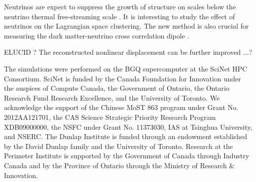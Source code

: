 \documentclass[aps,prd,twocolumn,superscriptaddress,groupedaddress,nofootinbib]{revtex4}  %
\begin{document}
Neutrinos are expect to suppress the growth of structure on scales below the 
neutrino thermal free-streaming scale \cite{1980bond,1997hu}.
It is interesting to study the effect of neutrinos on the Lagrangian space 
clustering. 
The new method is also crucial for measuring the dark matter-neutrino cross 
correlation dipole \cite{2014zhm,2016zhm}. 


ELUCID \cite{2014ApJ...794...94W}?
The reconstructed nonlinear displacement can be further improved ...?


The simulations were performed on the BGQ supercomputer at the SciNet HPC 
Consortium. SciNet is funded by the Canada Foundation for Innovation under 
the auspices of Compute Canada, the Government of Ontario, the Ontario Research 
Fund Research Excellence, and the University of Toronto.
We acknowledge the support of the Chinese MoST 863 program under Grant 
No. 2012AA121701, the CAS Science Strategic Priority Research Program 
XDB09000000, the NSFC under Grant No. 11373030, IAS at Tsinghua University, 
 and NSERC.
The Dunlap Institute is funded through an endowment established by the David Dunlap family and the University of Toronto.
Research at the Perimeter Institute is supported by the Government of Canada
through Industry Canada and by the Province of Ontario through the Ministry of
Research $\&$ Innovation.



\end{document}
